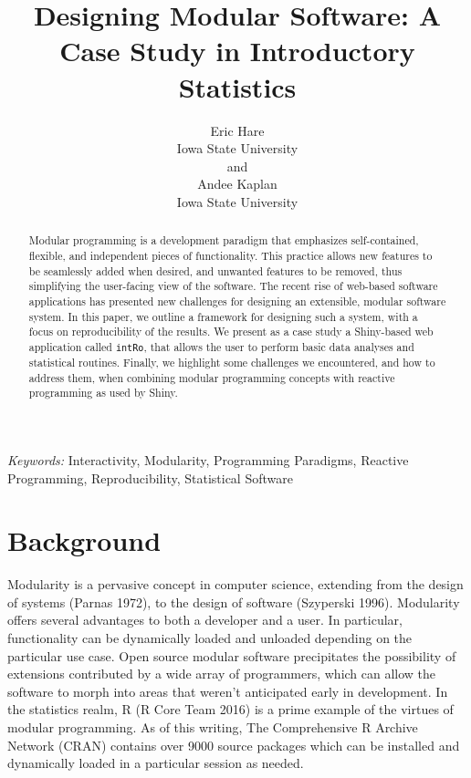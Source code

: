 \documentclass[12pt,]{article}
\title{\bf Designing Modular Software: A Case Study in Introductory Statistics}
\author{Eric Hare \\ Iowa State University \\ \texttt{}  and \\ Andee Kaplan \\ Iowa State University \\ \texttt{} }
\date{}
\begin{document}
\def\spacingset#1{\renewcommand{\baselinestretch}%
{#1}\small\normalsize} \spacingset{1}


\maketitle


\begin{abstract}
Modular programming is a development paradigm that emphasizes
self-contained, flexible, and independent pieces of functionality. This
practice allows new features to be seamlessly added when desired, and
unwanted features to be removed, thus simplifying the user-facing view
of the software. The recent rise of web-based software applications has
presented new challenges for designing an extensible, modular software
system. In this paper, we outline a framework for designing such a
system, with a focus on reproducibility of the results. We present as a
case study a Shiny-based web application called \texttt{intRo}, that
allows the user to perform basic data analyses and statistical routines.
Finally, we highlight some challenges we encountered, and how to address
them, when combining modular programming concepts with reactive
programming as used by Shiny.
\end{abstract}

\noindent%
{\it Keywords:}  Interactivity, Modularity, Programming Paradigms, Reactive Programming,
Reproducibility, Statistical Software
\vfill

\newpage
\spacingset{1.45} %


\section{Background}\label{background}

Modularity is a pervasive concept in computer science, extending from
the design of systems (Parnas 1972), to the design of software
(Szyperski 1996). Modularity offers several advantages to both a
developer and a user. In particular, functionality can be dynamically
loaded and unloaded depending on the particular use case. Open source
modular software precipitates the possibility of extensions contributed
by a wide array of programmers, which can allow the software to morph
into areas that weren't anticipated early in development. In the
statistics realm, R (R Core Team 2016) is a prime example of the virtues
of modular programming. As of this writing, The Comprehensive R Archive
Network (CRAN) contains over 9000 source packages which can be installed
and dynamically loaded in a particular session as needed.
\end{document}
